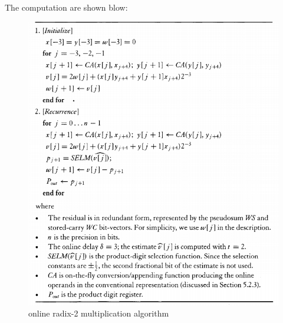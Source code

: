 \documentclass[10pt]{article}
\begin{document}
The computation are shown blow:

        \begin{figure}[H]
       \centering
       \includegraphics[scale=0.5]{multi_2_algo.PNG}
       \caption{online radix-2 multiplication algorithm }
    \end{figure}
    
\end{document}
